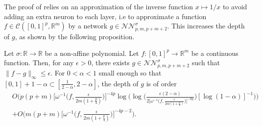 \documentclass[anon,12pt]{colt2021} %
\begin{document}
The proof of \citep[Proosition 4.11]{kidger2019universal} relies on an approximation of the inverse function $x \mapsto 1/x$ to avoid adding an extra neuron to each layer, i.e to approximate a function $f \in \mathcal{C}([0,1]^{p}, \mathbb{R}^{m})$ by a network $g \in \mathcal{NN}_{p,m,p+m+2}^{\sigma}$. This increases the depth of $g$, as shown by the following proposition.

\begin{proposition} \label{prop_poly_noextra}
Let $\sigma : \mathbb{R} \rightarrow \mathbb{R}$ be a non-affine polynomial. Let $f: [0,1]^{p} \rightarrow \mathbb{R}^{m}$ be a continuous function. Then, for any $\epsilon > 0$, there exists $g \in \mathcal{NN}_{p,m,p+m+2}^{\sigma}$ such that $\| f - g \|_{\infty} \leq \epsilon$. For $0<\alpha < 1$ small enough so that $[0,1] + 1 - \alpha \subset [\frac{1}{2-\alpha}, 2-\alpha]$, the depth of $g$ is of order
\begin{align*}
    &O\bigg(p(p+m) \big[ \omega^{-1} \big(f, \frac{\epsilon }{2m(1+\frac{p}{4})}\big) \big]^{-4p} \log \bigg( \log \big(\frac{\epsilon (2-\alpha)}{2\big[ \omega^{-1}\big(f, \frac{\epsilon}{2m(1+\frac{p}{4})}\big) \big]^{-8p}} \big) [ \log(1-\alpha) ]^{-1} \bigg) \bigg) \\
    &+O\bigg( m(p+m) \big[ \omega^{-1}\big(f, \frac{\epsilon}{2m(1+\frac{p}{4})}\big) \big]^{-4p-2} \bigg).
\end{align*}
\end{proposition}
\end{document}
